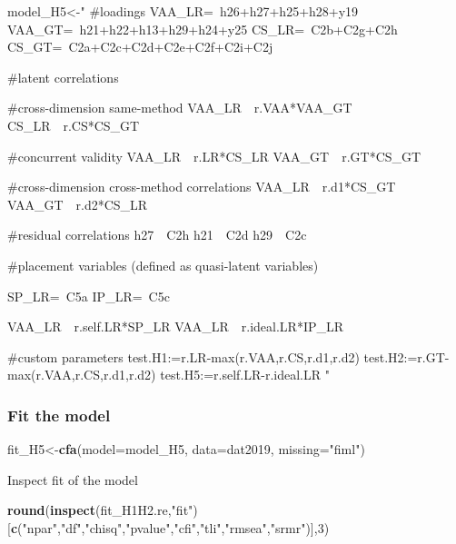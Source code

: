 \documentclass[
]{article}
\newenvironment{Shaded}{\begin{snugshade}}{\end{snugshade}}
\newcommand{\DataTypeTok}[1]{\textcolor[rgb]{0.13,0.29,0.53}{#1}}
\newcommand{\DecValTok}[1]{\textcolor[rgb]{0.00,0.00,0.81}{#1}}
\newcommand{\KeywordTok}[1]{\textcolor[rgb]{0.13,0.29,0.53}{\textbf{#1}}}
\newcommand{\NormalTok}[1]{#1}
\newcommand{\StringTok}[1]{\textcolor[rgb]{0.31,0.60,0.02}{#1}}
\begin{document}
\begin{Shaded}
\begin{Highlighting}[]
\NormalTok{model_H5<-}\StringTok{"}
\StringTok{#loadings}
\StringTok{VAA_LR=~h26+h27+h25+h28+y19}
\StringTok{VAA_GT=~h21+h22+h13+h29+h24+y25}
\StringTok{CS_LR=~C2b+C2g+C2h}
\StringTok{CS_GT=~C2a+C2c+C2d+C2e+C2f+C2i+C2j}

\StringTok{#latent correlations}

\StringTok{#cross-dimension same-method}
\StringTok{VAA_LR~~r.VAA*VAA_GT}
\StringTok{CS_LR~~r.CS*CS_GT}

\StringTok{#concurrent validity}
\StringTok{VAA_LR~~r.LR*CS_LR}
\StringTok{VAA_GT~~r.GT*CS_GT}

\StringTok{#cross-dimension cross-method correlations}
\StringTok{VAA_LR~~r.d1*CS_GT}
\StringTok{VAA_GT~~r.d2*CS_LR}

\StringTok{#residual correlations}
\StringTok{h27~~C2h}
\StringTok{h21~~C2d}
\StringTok{h29~~C2c}

\StringTok{#placement variables (defined as quasi-latent variables)}

\StringTok{SP_LR=~C5a}
\StringTok{IP_LR=~C5c}

\StringTok{VAA_LR~~r.self.LR*SP_LR}
\StringTok{VAA_LR~~r.ideal.LR*IP_LR}

\StringTok{#custom parameters}
\StringTok{test.H1:=r.LR-max(r.VAA,r.CS,r.d1,r.d2)}
\StringTok{test.H2:=r.GT-max(r.VAA,r.CS,r.d1,r.d2)}
\StringTok{test.H5:=r.self.LR-r.ideal.LR}
\StringTok{"}
\end{Highlighting}
\end{Shaded}

\hypertarget{fit-the-model-1}{%
\subsubsection{Fit the model}\label{fit-the-model-1}}

\begin{Shaded}
\begin{Highlighting}[]
\NormalTok{fit_H5<-}\KeywordTok{cfa}\NormalTok{(}\DataTypeTok{model=}\NormalTok{model_H5,}
            \DataTypeTok{data=}\NormalTok{dat2019,}
            \DataTypeTok{missing=}\StringTok{"fiml"}\NormalTok{)}
\end{Highlighting}
\end{Shaded}

Inspect fit of the model

\begin{Shaded}
\begin{Highlighting}[]
\KeywordTok{round}\NormalTok{(}\KeywordTok{inspect}\NormalTok{(fit_H1H2.re,}\StringTok{"fit"}\NormalTok{)}
\NormalTok{      [}\KeywordTok{c}\NormalTok{(}\StringTok{"npar"}\NormalTok{,}\StringTok{"df"}\NormalTok{,}\StringTok{"chisq"}\NormalTok{,}\StringTok{"pvalue"}\NormalTok{,}\StringTok{"cfi"}\NormalTok{,}\StringTok{"tli"}\NormalTok{,}\StringTok{"rmsea"}\NormalTok{,}\StringTok{"srmr"}\NormalTok{)],}\DecValTok{3}\NormalTok{)}
\end{Highlighting}
\end{Shaded}
\end{document}
